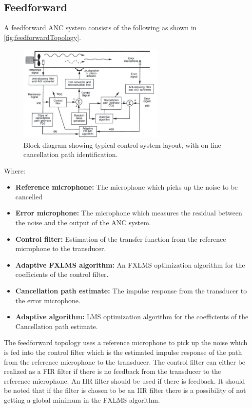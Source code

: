 \subsection*{Feedforward}
A feedforward ANC system consists of the following as shown in \autoref{fig:feedforwardTopology}.
\begin{figure}[H]
	\centering
	\includegraphics[width=0.65\textwidth]{figures/BasicSystem/feedforward}
	\caption{Block diagram showing typical control system layout, with on-line cancellation path identification. \cite{Hansen2}}
	\label{fig:feedforwardTopology}
\end{figure}
Where:
\begin{itemize}
\item \textbf{Reference microphone:} The microphone which picks up the noise to be cancelled 
\item \textbf{Error microphone:} The microphone which measures the residual between the noise and the output of the ANC system.
\item \textbf{Control filter:} Estimation of the transfer function from the reference microphone to the transducer. 
\item \textbf{Adaptive FXLMS algorithm:} An FXLMS optimization algorithm for the coefficients of the control filter.
\item \textbf{Cancellation path estimate:} The impulse response from the transducer to the error microphone.
\item \textbf{Adaptive algorithm:} LMS optimization algorithm for the coefficients of the Cancellation path estimate.
\end{itemize}

The feedforward topology uses a reference microphone to pick up the noise which is fed into the control filter which is the estimated impulse response of the path from the reference microphone to the transducer. The control filter can either be realized as a FIR filter if there is no feedback from the transducer to the reference microphone. An IIR filter should be used if there is feedback. It should be noted that if the filter is chosen to be an IIR filter there is a possibility of not getting a global minimum in the FXLMS algorithm.\\\\

